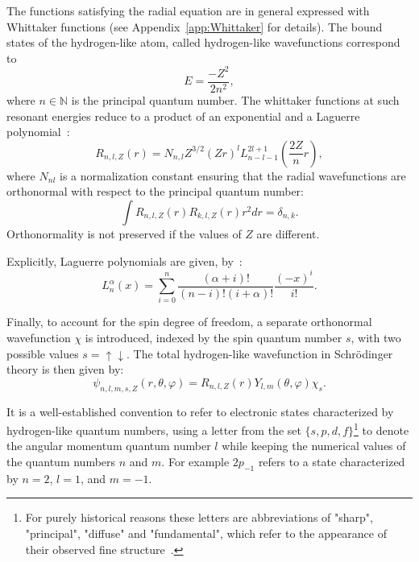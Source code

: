 
The functions satisfying the radial equation are in general expressed with Whittaker functions (see Appendix~\ref{app:Whittaker} for details). The bound states of the hydrogen-like atom, called hydrogen-like wavefunctions correspond to 
\begin{equation} \label{SchEnergy}
    E=\frac{-Z^2}{2n^2},
\end{equation} 
 where $n \in \mathbb{N}$ is the principal quantum number. The whittaker functions at such resonant energies reduce to a product of an exponential and a Laguerre polynomial~\cite{LandauQM}:
\begin{equation}
	R_{n,l,Z}(r)=N_{n,l}Z^{3/2}(Z r)^l L_{n-l-1}^{2l+1}\left(\frac{2Z}{n}r \right),
\end{equation}
where $N_{nl}$ is a normalization constant ensuring that the radial wavefunctions are orthonormal with respect to the principal quantum number:
\begin{equation}
	\int R_{n,l,Z}(r) R_{k,l,Z}(r) r^2 dr = \delta_{n,k}.
\end{equation}
Orthonormality is not preserved if the values of $Z$ are different.

Explicitly, Laguerre polynomials are given, by~\cite{AS}:
\begin{equation} \label{Laguerre}
    L_n^\alpha (x) = \sum_{i=0}^n \frac{(\alpha+i)!}{(n-i)!(i+\alpha)!}\frac{(-x)^i}{i!}.
\end{equation}

Finally, to account for the spin degree of freedom, a separate orthonormal wavefunction $\chi$ is introduced, indexed by the spin quantum number $s$, with two possible values $s=\uparrow \downarrow $. The total hydrogen-like wavefunction in Schr\"odinger theory is then given by:
\begin{equation}
	\psi_{n,l,m,s,Z}(r,\theta,\varphi) = R_{n,l,Z}(r)Y_{l,m}(\theta,\varphi)\chi_s.
\end{equation}

It is a well-established convention to refer to electronic states characterized by hydrogen-like quantum numbers, using a letter from the set $\{s,p,d,f\}$\footnote{For purely historical reasons these letters are abbreviations of "sharp", "principal", "diffuse" and "fundamental", which refer to the appearance of their observed fine structure~\cite{ebbing2007general}.} to denote the angular momentum quantum number $l$ while keeping the numerical values of the quantum numbers $n$ and $m$. For example $2p_{-1}$ refers to a state characterized by $n=2$, $l=1$, and $m=-1$.

